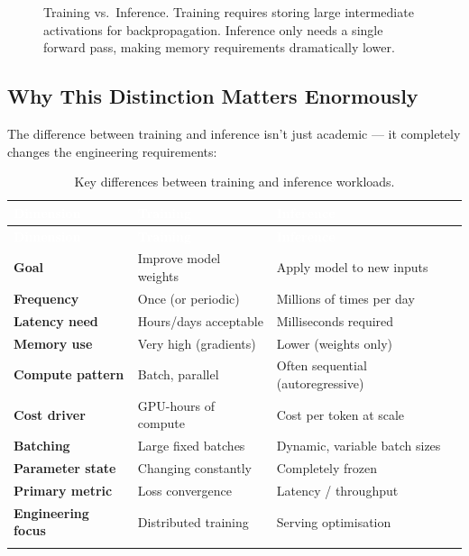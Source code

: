 \documentclass[12pt, twoside, openright]{book}
\begin{document}
\begin{figure}[htbp]
\caption{Training vs.\ Inference. Training requires storing large
intermediate activations for backpropagation. Inference only needs
a single forward pass, making memory requirements dramatically lower.}
\label{fig:train-vs-infer}
\end{figure}

\subsection{Why This Distinction Matters Enormously}

The difference between training and inference isn't just academic ---
it completely changes the engineering requirements:

\vspace{6pt}
\begin{longtable}{>{\bfseries}p{3cm} p{5cm} p{5cm}}
\rowcolor{tableheadbg}
\textcolor{white}{\textbf{Dimension}} &
\textcolor{white}{\textbf{Training}} &
\textcolor{white}{\textbf{Inference}} \\
\toprule
\endfirsthead
\rowcolor{tableheadbg}
\textcolor{white}{\textbf{Dimension}} &
\textcolor{white}{\textbf{Training}} &
\textcolor{white}{\textbf{Inference}} \\
\toprule
\endhead
Goal & Improve model weights & Apply model to new inputs \\
Frequency & Once (or periodic) & Millions of times per day \\
Latency need & Hours/days acceptable & Milliseconds required \\
Memory use & Very high (gradients) & Lower (weights only) \\
Compute pattern & Batch, parallel & Often sequential (autoregressive) \\
Cost driver & GPU-hours of compute & Cost per token at scale \\
Batching & Large fixed batches & Dynamic, variable batch sizes \\
Parameter state & Changing constantly & Completely frozen \\
Primary metric & Loss convergence & Latency / throughput \\
Engineering focus & Distributed training & Serving optimisation \\
\bottomrule
\caption{Key differences between training and inference workloads.}
\label{tab:train-vs-infer}
\end{longtable}
\end{document}
